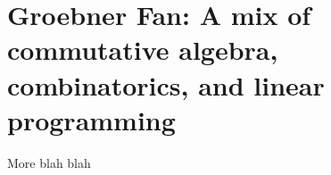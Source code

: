 \section{Groebner Fan: A mix of commutative algebra, combinatorics, and linear programming}

More blah blah
